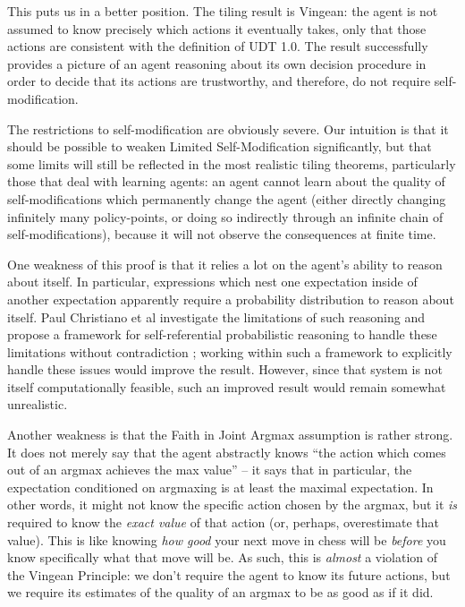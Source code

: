 \documentclass{article}
\begin{document}
This puts us in a better position. The tiling result is Vingean: the agent is not assumed to know precisely which actions it eventually takes, only that those actions are consistent with the definition of UDT 1.0. The result successfully provides a picture of an agent reasoning about its own decision procedure in order to decide that its actions are trustworthy, and therefore, do not require self-modification.

The restrictions to self-modification are obviously severe. Our intuition is that it should be possible to weaken Limited Self-Modification significantly, but that some limits will still be reflected in the most realistic tiling theorems, particularly those that deal with learning agents: an agent cannot learn about the quality of self-modifications which permanently change the agent (either directly changing infinitely many policy-points, or doing so indirectly through an infinite chain of self-modifications), because it will not observe the consequences at finite time.

One weakness of this proof is that it relies a lot on the agent's ability to reason about itself. In particular, expressions which nest one expectation inside of another expectation apparently require a probability distribution to reason about itself. Paul Christiano et al investigate the limitations of such reasoning and propose a framework for self-referential probabilistic reasoning to handle these limitations without contradiction \cite{christiano2013definability}; working within such a framework to explicitly handle these issues would improve the result. However, since that system is not itself computationally feasible, such an improved result would remain somewhat unrealistic.

Another weakness is that the Faith in Joint Argmax assumption is rather strong. It does not merely say that the agent abstractly knows ``the action which comes out of an argmax achieves the max value'' -- it says that in particular, the expectation conditioned on argmaxing is at least the maximal expectation. In other words, it might not know the specific action chosen by the argmax, but it \emph{is} required to know the \emph{exact value} of that action (or, perhaps, overestimate that value). This is like knowing \emph{how good} your next move in chess will be \emph{before} you know specifically what that move will be. As such, this is \emph{almost} a violation of the Vingean Principle: we don't require the agent to know its future actions, but we require its estimates of the quality of an argmax to be as good as if it did.
\end{document}
